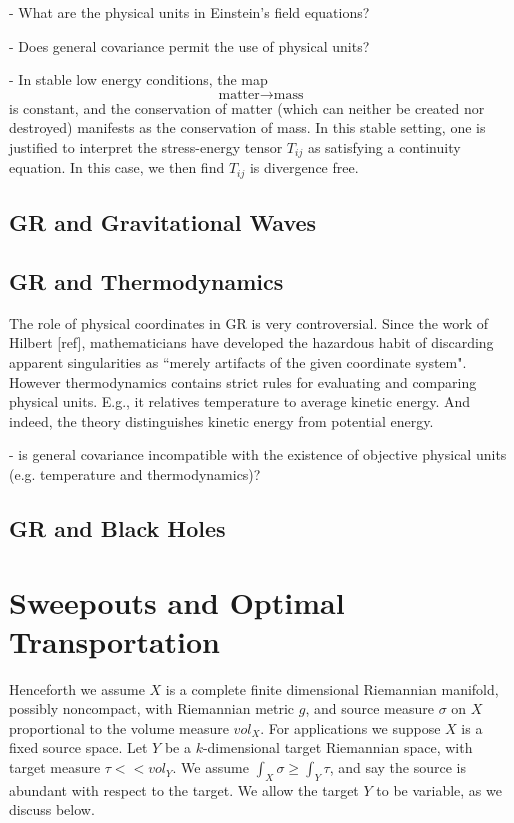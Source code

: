 \documentclass[12pt]{amsart}
\theoremstyle{remark}
\begin{document}
- What are the physical units in Einstein's field equations?

- Does general covariance permit the use of physical units?

- In stable low energy conditions, the map $$\text{matter} \to \text{mass}$$ is constant, and the conservation of matter (which can neither be created nor destroyed) manifests as the conservation of mass. In this stable setting, one is justified to interpret the stress-energy tensor $T_{ij}$ as satisfying a continuity equation. In this case, we then find $T_{ij}$ is divergence free.

\subsection{GR and Gravitational Waves}

\subsection{GR and Thermodynamics}

The role of physical coordinates in GR is very controversial. Since the work of Hilbert [ref], mathematicians have developed the hazardous habit of discarding apparent singularities as ``merely artifacts of the given coordinate system". However thermodynamics contains strict rules for evaluating and comparing physical units. E.g., it relatives temperature to average kinetic energy. And indeed, the theory distinguishes kinetic energy from potential energy.

- is general covariance incompatible with the existence of objective physical units (e.g. temperature and thermodynamics)?


\subsection{GR and Black Holes}



\section{Sweepouts and Optimal Transportation}
Henceforth we assume $X$ is a complete finite dimensional Riemannian manifold, possibly noncompact, with Riemannian metric $g$, and source measure $\sigma$ on $X$ proportional to the volume measure $vol_X$. For applications we suppose $X$ is a fixed source space. Let $Y$ be a $k$-dimensional target Riemannian space, with target measure $\tau<<vol_Y$. We assume $\int_X \sigma \geq \int_Y \tau$, and say the source is abundant with respect to the target. We allow the target $Y$ to be variable, as we discuss below.
\end{document}
